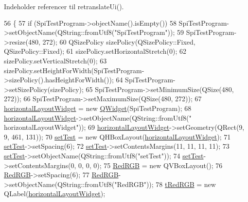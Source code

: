 Indeholder referencer til retranslate\+Ui().


\begin{DoxyCode}
56     \{
57         \textcolor{keywordflow}{if} (SpiTestProgram->objectName().isEmpty())
58             SpiTestProgram->setObjectName(QString::fromUtf8(\textcolor{stringliteral}{"SpiTestProgram"}));
59         SpiTestProgram->resize(480, 272);
60         QSizePolicy sizePolicy(QSizePolicy::Fixed, QSizePolicy::Fixed);
61         sizePolicy.setHorizontalStretch(0);
62         sizePolicy.setVerticalStretch(0);
63         sizePolicy.setHeightForWidth(SpiTestProgram->sizePolicy().hasHeightForWidth());
64         SpiTestProgram->setSizePolicy(sizePolicy);
65         SpiTestProgram->setMinimumSize(QSize(480, 272));
66         SpiTestProgram->setMaximumSize(QSize(480, 272));
67         \hyperlink{class_ui___spi_test_program_a8d9662f61dc85ce78495602f1d03006f}{horizontalLayoutWidget} = \textcolor{keyword}{new} \hyperlink{class_q_widget}{QWidget}(SpiTestProgram);
68         \hyperlink{class_ui___spi_test_program_a8d9662f61dc85ce78495602f1d03006f}{horizontalLayoutWidget}->setObjectName(QString::fromUtf8(\textcolor{stringliteral}{"
      horizontalLayoutWidget"}));
69         \hyperlink{class_ui___spi_test_program_a8d9662f61dc85ce78495602f1d03006f}{horizontalLayoutWidget}->setGeometry(QRect(9, 9, 461, 131));
70         \hyperlink{class_ui___spi_test_program_ab40f35f9bcce17af63ba573e1e8ee485}{setTest} = \textcolor{keyword}{new} QHBoxLayout(\hyperlink{class_ui___spi_test_program_a8d9662f61dc85ce78495602f1d03006f}{horizontalLayoutWidget});
71         \hyperlink{class_ui___spi_test_program_ab40f35f9bcce17af63ba573e1e8ee485}{setTest}->setSpacing(6);
72         \hyperlink{class_ui___spi_test_program_ab40f35f9bcce17af63ba573e1e8ee485}{setTest}->setContentsMargins(11, 11, 11, 11);
73         \hyperlink{class_ui___spi_test_program_ab40f35f9bcce17af63ba573e1e8ee485}{setTest}->setObjectName(QString::fromUtf8(\textcolor{stringliteral}{"setTest"}));
74         \hyperlink{class_ui___spi_test_program_ab40f35f9bcce17af63ba573e1e8ee485}{setTest}->setContentsMargins(0, 0, 0, 0);
75         \hyperlink{class_ui___spi_test_program_a266d140f4ccd88877aee1b242908b21d}{RedRGB} = \textcolor{keyword}{new} QVBoxLayout();
76         \hyperlink{class_ui___spi_test_program_a266d140f4ccd88877aee1b242908b21d}{RedRGB}->setSpacing(6);
77         \hyperlink{class_ui___spi_test_program_a266d140f4ccd88877aee1b242908b21d}{RedRGB}->setObjectName(QString::fromUtf8(\textcolor{stringliteral}{"RedRGB"}));
78         \hyperlink{class_ui___spi_test_program_a44f9277d36451995887541d6e333c772}{tRedRGB} = \textcolor{keyword}{new} QLabel(\hyperlink{class_ui___spi_test_program_a8d9662f61dc85ce78495602f1d03006f}{horizontalLayoutWidget});

\end{DoxyCode}
